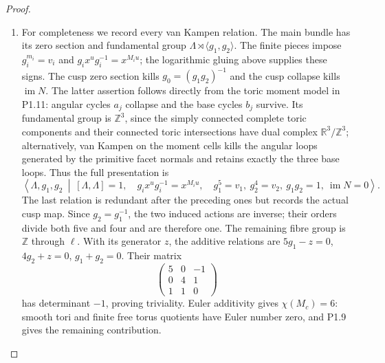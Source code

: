 \begin{proof}
\begin{enumerate}[label=\arabic*.]
\item For completeness we record every van Kampen relation.  The main
bundle has its zero section and fundamental group
$\Lambda\rtimes\langle g_1,g_2\rangle$.
The finite pieces impose
$g_i^{m_i}=v_i$ and $g_ix^ug_i^{-1}=x^{M_iu}$; the logarithmic gluing
above supplies these signs.  The cusp zero section kills
$g_0=(g_1g_2)^{-1}$ and the cusp collapse kills $\operatorname{im}N$.
The latter assertion follows directly from the toric moment model in
P1.11: angular cycles $a_j$ collapse and the base cycles $b_j$ survive.
Its fundamental group is $\mathbb Z^3$, since the simply connected
complete toric components and their connected toric intersections have
dual complex $\mathbb R^3/\mathbb Z^3$; alternatively, van Kampen on
the moment cells kills the angular loops generated by the primitive
facet normals and retains exactly the three base loops.
Thus the full presentation is
\[
\left\langle \Lambda,g_1,g_2\ \middle|\
 [\Lambda,\Lambda]=1,\quad
 g_ix^ug_i^{-1}=x^{M_iu},\quad
 g_1^5=v_1,\ g_2^4=v_2,\ g_1g_2=1,\ \operatorname{im}N=0
\right\rangle.
\]
The last relation is redundant after the preceding ones but records
the actual cusp map.  Since $g_2=g_1^{-1}$, the two induced actions are
inverse; their orders divide both five and four and are therefore one.
The remaining fibre group is $\mathbb Z$ through $\ell$.  With its
generator $z$, the additive relations are
$5g_1-z=0$, $4g_2+z=0$, $g_1+g_2=0$.
Their matrix
\[
\begin{pmatrix}5&0&-1\\0&4&1\\1&1&0\end{pmatrix}
\]
has determinant $-1$, proving triviality.
Euler additivity gives $\chi(M_c)=6$: smooth tori and finite free
torus quotients have Euler number zero, and P1.9 gives the remaining
contribution.

\end{enumerate}
\end{proof}




